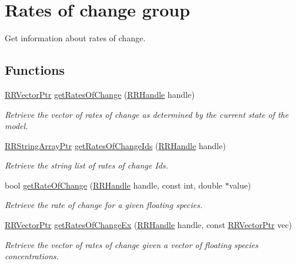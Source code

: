 \hypertarget{group__rate_of_change}{\section{Rates of change group}
\label{group__rate_of_change}
}


Get information about rates of change.  


\subsection*{Functions}
\begin{DoxyCompactItemize}
\item 
\hyperlink{rrc__types_8h_a3be72d6006034fd349f753d2bf441bf7}{R\+R\+Vector\+Ptr} \hyperlink{group__rate_of_change_gab8675813f06e4017dbe9d7584dc2fceb}{get\+Rates\+Of\+Change} (\hyperlink{rrc__types_8h_a1d68f0592372208fa5a5f2799ea4b3ae}{R\+R\+Handle} handle)
\begin{DoxyCompactList}\small\item\em Retrieve the vector of rates of change as determined by the current state of the model. \end{DoxyCompactList}\item 
\hyperlink{rrc__types_8h_a7c9475df6c7337d99482b13a365e7596}{R\+R\+String\+Array\+Ptr} \hyperlink{group__rate_of_change_ga4713af515e980542c14a735bc0e43983}{get\+Rates\+Of\+Change\+Ids} (\hyperlink{rrc__types_8h_a1d68f0592372208fa5a5f2799ea4b3ae}{R\+R\+Handle} handle)
\begin{DoxyCompactList}\small\item\em Retrieve the string list of rates of change Ids. \end{DoxyCompactList}\item 
bool \hyperlink{group__rate_of_change_ga07c04f81f07fad80bc78369b122972c2}{get\+Rate\+Of\+Change} (\hyperlink{rrc__types_8h_a1d68f0592372208fa5a5f2799ea4b3ae}{R\+R\+Handle} handle, const int, double $\ast$value)
\begin{DoxyCompactList}\small\item\em Retrieve the rate of change for a given floating species. \end{DoxyCompactList}\item 
\hyperlink{rrc__types_8h_a3be72d6006034fd349f753d2bf441bf7}{R\+R\+Vector\+Ptr} \hyperlink{group__rate_of_change_ga4e1783d741cc0c81954db891e085c664}{get\+Rates\+Of\+Change\+Ex} (\hyperlink{rrc__types_8h_a1d68f0592372208fa5a5f2799ea4b3ae}{R\+R\+Handle} handle, const \hyperlink{rrc__types_8h_a3be72d6006034fd349f753d2bf441bf7}{R\+R\+Vector\+Ptr} vec)
\begin{DoxyCompactList}\small\item\em Retrieve the vector of rates of change given a vector of floating species concentrations. \end{DoxyCompactList}\end{DoxyCompactItemize}


